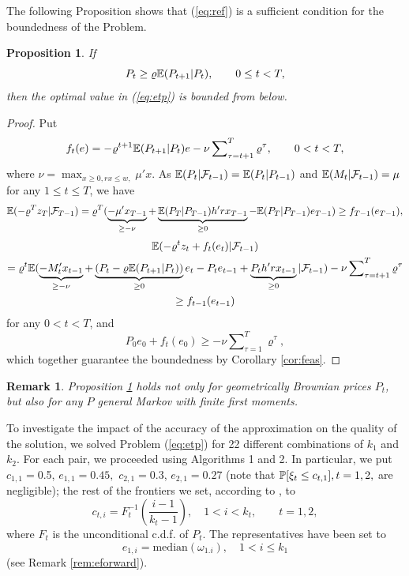 \documentclass{article}              %
\newtheorem{proposition}{Proposition}
\newtheorem{remark}{Remark}
\begin{document}
The following Proposition shows that (\ref{eq:ref}) is a sufficient
condition for the boundedness of the Problem.
\begin{proposition}
\label{prop:pprop}If 
\begin{equation}
P_{t}\geq\varrho\E(P_{t+1}|P_{t}),\qquad0\leq t<T,\label{eq:eb}
\end{equation}
then the optimal value in (\ref{eq:etp}) is bounded from below.
\end{proposition}

\begin{proof}
Put 
\[
f_{t}(e)=-\varrho^{t+1}\E(P_{t+1}|P_{t})e-\nu\sum\nolimits_{\tau=t+1}^{T} \varrho^\tau ,\qquad0<t<T,
\]
where $\nu=\max_{x\geq0,rx\leq w,}\mu'x$. As $\E(P_t|\F_{t-1})=\E(P_t|P_{t-1})$ and 
$\E(M_t|\F_{t-1})=\mu$ for any $1\leq t \leq T$, we have
$$
\E(-\varrho^{T}z_{T}|\F_{T-1})
=\varrho^{T}(\underbrace{-\mu'x_{T-1}}_{\geq -\nu}+\underbrace{\E(P_{T}|P_{T-1})h'rx_{T-1}}_{\geq 0}-\E(P_{T}|P_{T-1})e_{T-1})
\geq
f_{T-1}(e_{T-1}),
$$
\begin{multline*}
\E(-\varrho^{t}z_{t}+f_{t}(e_{t})|\F_{t-1})\\
=\varrho^{t}\E(\underbrace{-M'_{t}x_{t-1}}_{\geq -\nu}+\underbrace{(P_{t}-\varrho\E(P_{t+1}|P_{t}))}_{\geq 0}e_t-P_te_{t-1}+\underbrace{P_th'rx_{t-1}}_{\geq 0}
|\F_{t-1})-\nu\sum\nolimits_{\tau=t+1}^{T} \varrho^\tau\\
\geq
f_{t-1}(e_{t-1})
\end{multline*}
for any $0<t<T$, and
\[
P_{0}e_{0}+f_{t}(e_0)
\geq
-\nu\sum\nolimits_{\tau=1}^{T} \varrho^\tau,
\]
which together guarantee the boundedness by Corollary \ref{cor:feas}.
\end{proof}
\begin{remark}
Proposition \ref{prop:pprop} holds not only for geometrically
Brownian prices $P_t$, but also for any $P$ general Markov with finite first
moments.
\end{remark}

\noindent To investigate the impact of the accuracy of the approximation on
the quality of the solution, we solved Problem (\ref{eq:etp}) for 22 different combinations of 
$k_{1}$ and $k_{2}$. For each pair, we proceeded
using Algorithms 1 and 2. In particular, we put $c_{1,1}=$0.5, $e_{1,1}=0.45,$
$c_{2,1}=0.3$, $e_{2,1}=0.27$ (note that $\P[\xi_{t}\leq c_{t,1}],t=1,2,$
are negligible); the rest of the frontiers we set, according to \cite{Smid09c}, to
\[
c_{t,i}=F_{t}^{-1}\left(\frac{i-1}{k_{t}-1}\right),\quad1<i<k_{t},\qquad t=1,2,
\]
where $F_{t}$ is the unconditional c.d.f. of $P_{t}$. The representatives have been set to 
$$
e_{1,i}=\mathrm{median}(\omega_{1.i}),\quad1<i\leq k_{1}
$$
(see Remark \ref{rem:eforward}).
\end{document}
